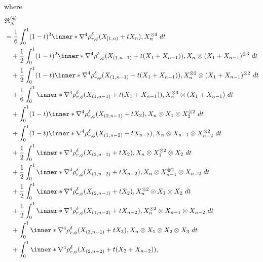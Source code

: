 \documentclass[aos]{imsart}
\begin{document}
\begin{appendix}
\begin{equation*}
\end{equation*}
where 
\begin{equation*}
\begin{aligned}
    & \mathfrak{R}_X^{(4)} \\
    & = \frac{1}{6} \int_0^1 (1-t)^3 \inner*{
        \nabla^4 \rho_{r,\phi}^\delta(X_{[1,n)} + t X_n), 
        X_n^{\otimes 4}} ~dt \\
    & \quad + \frac{1}{2} \int_0^1 (1-t)^2 \inner*{
        \nabla^4 \rho_{r,\phi}^\delta(X_{(1,n-1)} + t (X_1+X_{n-1})), 
        X_n \otimes (X_1 + X_{n-1})^{\otimes 3}} ~dt \\
    & \quad + \frac{1}{2} \int_0^1 (1-t) \inner*{
        \nabla^4 \rho_{r,\phi}^\delta(X_{(1,n-1)} + t (X_1+X_{n-1})), 
        X_n^{\otimes 2} \otimes (X_1 + X_{n-1})^{\otimes 2}} ~dt \\
    & \quad + \frac{1}{6} \int_0^1 \inner*{
        \nabla^4 \rho_{r,\phi}^\delta(X_{(1,n-1)} + t (X_1+X_{n-1})), 
        X_n^{\otimes 3} \otimes (X_1 + X_{n-1})} ~dt \\
    & \quad + \int_0^1 (1-t) \inner*{
        \nabla^4 \rho_{r,\phi}^\delta(X_{(2,n-1)} + t X_2), 
        X_n \otimes X_1 \otimes X_2^{\otimes 2}} ~dt \\
    & \quad + \int_0^1 (1-t) \inner*{
        \nabla^4 \rho_{r,\phi}^\delta(X_{(1,n-2)} + t X_{n-2}), 
        X_n \otimes X_{n-1} \otimes X_{n-2}^{\otimes 2}} ~dt \\
    & \quad + \frac{1}{2} \int_0^1 \inner*{
        \nabla^4 \rho_{r,\phi}^\delta(X_{(2,n-1)} + t X_2), 
        X_n \otimes X_1^{\otimes 2} \otimes X_2} ~dt \\
    & \quad + \frac{1}{2} \int_0^1 \inner*{
        \nabla^4 \rho_{r,\phi}^\delta(X_{(1,n-2)} + t X_{n-2}), 
        X_n \otimes X_{n-1}^{\otimes 2} \otimes X_{n-2}} ~dt \\
    & \quad + \frac{1}{2} \int_0^1 \inner*{
        \nabla^4 \rho_{r,\phi}^\delta(X_{(2,n-1)} + t X_2), 
        X_n^{\otimes 2} \otimes X_1 \otimes X_2} ~dt \\
    & \quad + \frac{1}{2} \int_0^1 \inner*{
        \nabla^4 \rho_{r,\phi}^\delta(X_{(1,n-2)} + t X_{n-2}), 
        X_n^{\otimes 2} \otimes X_{n-1} \otimes X_{n-2}} ~dt \\
    & \quad + \int_0^1 \inner*{
        \nabla^4 \rho_{r,\phi}^\delta(X_{(3,n-1)} + t X_3), 
        X_n \otimes X_1 \otimes X_2 \otimes X_3} ~dt \\
    & \quad + \int_0^1 \inner*{
        \nabla^4 \rho_{r,\phi}^\delta(X_{(2,n-2)} + t (X_2 + X_{n-2})), 
}
\end{aligned}
\end{equation*}
\end{appendix}
\end{document}
